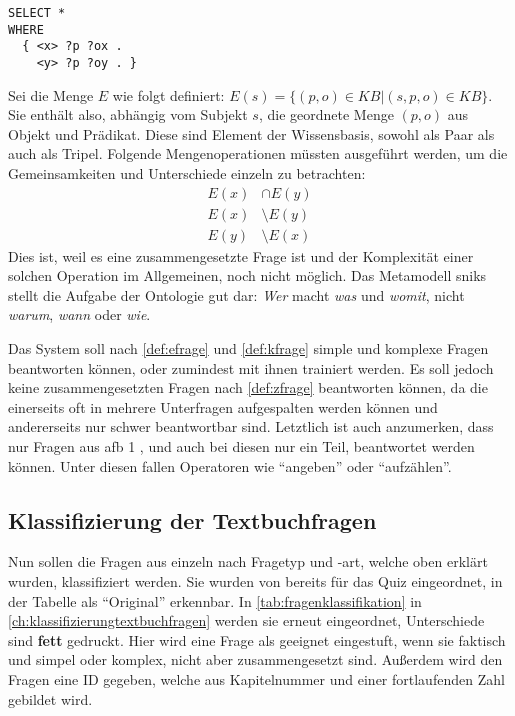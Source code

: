 \begin{lstlisting}[language=SPARQL]
SELECT *
WHERE
  { <x> ?p ?ox .
    <y> ?p ?oy . }
\end{lstlisting}
Sei die Menge $E$ wie folgt definiert:
$E(s) = \{(p,o) \in KB | (s,p,o) \in KB\}$.
Sie enthält also, abhängig vom Subjekt $s$, die geordnete Menge $(p,o)$ aus Objekt und Prädikat.
Diese sind Element der Wissensbasis, sowohl als Paar als auch als Tripel.
Folgende Mengenoperationen müssten ausgeführt werden, um die Gemeinsamkeiten und Unterschiede einzeln zu betrachten:
\begin{align*}
E(x) &\cap E(y) \\
E(x) &\setminus E(y) \\
E(y) &\setminus E(x)
\end{align*}
Dies ist, weil es eine zusammengesetzte Frage ist und der Komplexität einer solchen Operation im Allgemeinen, noch nicht möglich.
Das Metamodell \ac{snik}s stellt die Aufgabe der Ontologie gut dar: \emph{Wer} macht \emph{was} und \emph{womit}, nicht \emph{warum}, \emph{wann} oder \emph{wie}.

Das System soll nach \cref{def:efrage} und \cref{def:kfrage} simple und komplexe Fragen beantworten können, oder zumindest mit ihnen trainiert werden.
Es soll jedoch keine zusammengesetzten Fragen nach \cref{def:zfrage} beantworten können, da die einerseits oft in mehrere Unterfragen aufgespalten werden können
und andererseits nur schwer beantwortbar sind.
Letztlich ist auch anzumerken, dass nur Fragen aus \ac{afb} 1 \citep{afb}, und auch bei diesen nur ein Teil, beantwortet werden können.
Unter diesen fallen Operatoren wie \enquote{angeben} oder \enquote{aufzählen}.

\subsection{Klassifizierung der Textbuchfragen}\label{sub:fragenklassifikation}

Nun sollen die Fragen aus \citet{bb} einzeln nach Fragetyp und -art, welche oben erklärt wurden, klassifiziert werden.
Sie wurden von \citet{arneba} bereits für das Quiz eingeordnet, in der Tabelle als \enquote{Original} erkennbar.
In \cref{tab:fragenklassifikation} in \cref{ch:klassifizierungtextbuchfragen} werden sie erneut eingeordnet, Unterschiede sind \textbf{fett} gedruckt.
Hier wird eine Frage als geeignet eingestuft, wenn sie faktisch und simpel oder komplex, nicht aber zusammengesetzt sind.
Außerdem wird den Fragen eine ID gegeben, welche aus Kapitelnummer und einer fortlaufenden Zahl gebildet wird.

